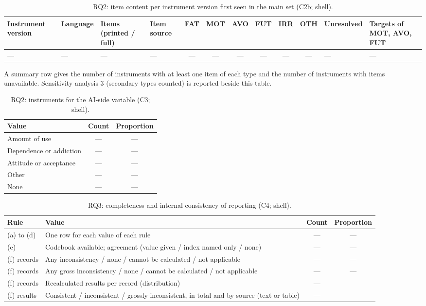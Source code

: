 \begin{landscape}
\begin{table}[!htbp]
\centering
\caption{RQ2: item content per instrument version first seen in the main set (C2b; shell).}
\footnotesize
\begin{tabularx}{\linewidth}{XlXlccccccXX}
\toprule
Instrument version & Language & Items (printed / full) & Item source & FAT & MOT & AVO & FUT & IRR & OTH & Unresolved & Targets of MOT, AVO, FUT \\
\midrule
--- & --- & --- & --- & --- & --- & --- & --- & --- & --- & --- & --- \\
\bottomrule
\end{tabularx}

\smallskip
\raggedright\footnotesize A summary row gives the number of instruments with at least one item of each type and the
number of instruments with items unavailable. Sensitivity analysis 3 (secondary types counted) is reported beside this
table.
\end{table}
\end{landscape}

\begin{table}[!htbp]
\centering
\caption{RQ2: instruments for the AI-side variable (C3; shell).}
\small
\begin{tabularx}{\linewidth}{Xcc}
\toprule
Value & Count & Proportion \\
\midrule
Amount of use & --- & --- \\
Dependence or addiction & --- & --- \\
Attitude or acceptance & --- & --- \\
Other & --- & --- \\
None & --- & --- \\
\bottomrule
\end{tabularx}
\end{table}

\begin{table}[!htbp]
\centering
\caption{RQ3: completeness and internal consistency of reporting (C4; shell).}
\small
\begin{tabularx}{\linewidth}{lXcc}
\toprule
Rule & Value & Count & Proportion \\
\midrule
(a) to (d) & One row for each value of each rule & --- & --- \\
(e) & Codebook available; agreement (value given / index named only / none) & --- & --- \\
(f) records & Any inconsistency / none / cannot be calculated / not applicable & --- & --- \\
(f) records & Any gross inconsistency / none / cannot be calculated / not applicable & --- & --- \\
(f) records & Recalculated results per record (distribution) & --- & \\
(f) results & Consistent / inconsistent / grossly inconsistent, in total and by source (text or table) & --- & \\
\bottomrule
\end{tabularx}
\end{table}

